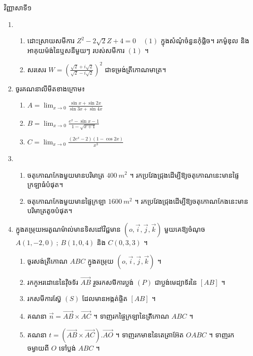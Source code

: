 \documentclass[a4paper,11pt]{article}
\newcommand{\kml}{\fontspec[Script=Khmer]{Khmer OS Muol Light}\selectfont}
\begin{document}
\begin{center}

{\kml វិញ្ញាសាទី១}
\end{center}
\vspace{-0.3cm}
\begin{enumerate}[I]
\item \begin{enumerate}[1]
\item ដោះស្រាយសមីការ $Z^2-2\sqrt{2} Z+4=0 \quad(1)$ ក្នុងសំណុំចំនួនកុំផ្លិច។ រកម៉ូឌុល និងអាគុយម៉ង់នៃឬសនីមួយៗ របស់សមីការ $(1)$ ។
\item សរសេរ $W=\left(\frac{\sqrt{2}+i\sqrt{2}}{\sqrt{2}-i\sqrt{2}}\right)^2$ ជាទម្រង់ត្រីកោណមាត្រ។
\end{enumerate}
\item ចូរគណនាលីមីតខាងក្រោម៖
\begin{multicols}{3}
\begin{enumerate}[a]
\item $A=\lim_{x\to 0}{\frac{\sin x+\sin 2x}{\sin 3x+\sin 4x}}$
\item $B=\lim_{x\to 0}{\frac{e^x-\sin x-1}{1-\sqrt{x+1}}}$
\item $C=\lim_{x\to0}{\frac{(2e^x-2)(1-\cos 2x)}{x^3}}$
\end{enumerate}
\end{multicols}
\item \begin{enumerate}[1]
\item ចតុកោណកែងមួយមានបរិមាត្រ $400 ~ m^2$ ។ រកប្រវែងជ្រុងដើម្បីឱ្យចតុកោណនេះមានផ្ទៃក្រឡាធំបំផុត។
\item ចតុកោណកែងមួយមានផ្ទៃក្រឡា $1600 ~ m^2$ ។ រកប្រវែងជ្រុងដើម្បីឱ្យចតុកោណកែងនេះមានបរិមាត្រតូចបំផុត។
\end{enumerate}
\item ក្នុងតម្រុយអរតូណម៉ាល់មានទិសដៅវិជ្ជមាន $(o,\vec{i}, \vec{j} ,\vec{k})$ មួយគេឱ្យចំណុច $A(1,-2,0) ~;~ B(1,0,4)$ និង $C(0,3,3)$ ។
\begin{enumerate}[1]
\item ចូរសង់ត្រីកោណ $ABC$ ក្នុងតម្រុយ $(o,\vec{i}, \vec{j} ,\vec{k})$ ។
\item រកកូអរដោនេនៃវ៉ិចទ័រ $\overrightarrow{AB}$ រួចរកសមីការប្លង់ $(P)$ ជាប្លង់មេដ្យាទ័រនៃ $[AB]$ ។
\item រកសមីការស្វ៊ែ $(S)$ ដែលមានអង្កត់ផ្ចិត $[AB]$ ។
\item គណនា $\vec{n}=\overrightarrow{AB}\times \overrightarrow{AC}$ ។ ទាញរកផ្ទៃក្រឡានៃត្រីកោណ $ABC$ ។
\item គណនា $t=(\overrightarrow{AB}\times \overrightarrow{AC}).\overrightarrow{AO}$ ។ ទាញរកមាឌនៃតេត្រាអ៊ែត $OABC$ ។ ទាញរកចម្ងាយពី $O$ ទៅប្លង់ $ABC$ ។

\end{enumerate}
\end{enumerate}
\end{document}
